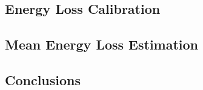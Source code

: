
\subsection{Energy Loss Calibration}

\subsection{Mean Energy Loss Estimation}

\subsection{Conclusions}
